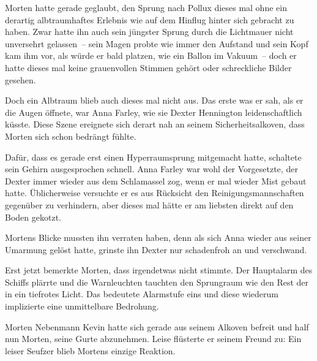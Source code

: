 Morten hatte gerade geglaubt, den Sprung nach Pollux dieses mal ohne ein derartig albtraumhaftes Erlebnis wie auf dem Hinflug hinter sich gebracht zu haben. Zwar hatte ihn auch sein jüngster Sprung durch die Lichtmauer nicht unversehrt gelassen~-- sein Magen probte wie immer den Aufstand und sein Kopf kam ihm vor, als würde er bald platzen, wie ein Ballon im Vakuum~-- doch er hatte dieses mal keine grauenvollen Stimmen gehört oder schreckliche Bilder gesehen.

\par

Doch ein Albtraum blieb auch dieses mal nicht aus. Das erste was er sah, als er die Augen öffnete, war Anna Farley, wie sie Dexter Hennington leidenschaftlich küsste. Diese Szene ereignete sich derart nah an seinem Sicherheitsalkoven, dass Morten sich schon bedrängt fühlte.

\par

Dafür, dass es gerade erst einen Hyperraumsprung mitgemacht hatte, schaltete sein Gehirn ausgesprochen schnell. Anna Farley war wohl der Vorgesetzte, der Dexter immer wieder aus dem Schlamassel zog, wenn er mal wieder Mist gebaut hatte. Üblicherweise versuchte er es aus Rücksicht den Reinigungsmannschaften gegenüber zu verhindern, aber dieses mal hätte er am liebsten direkt auf den Boden gekotzt.

\par

Mortens Blicke mussten ihn verraten haben, denn als sich Anna wieder aus seiner Umarmung gelöst hatte, grinste ihn Dexter nur schadenfroh an und verschwand.

\par

Erst jetzt bemerkte Morten, dass irgendetwas nicht stimmte. Der Hauptalarm des Schiffs plärrte und die Warnleuchten tauchten den Sprungraum wie den Rest der  in ein tiefrotes Licht. Das bedeutete Alarmstufe eins und diese wiederum implizierte eine unmittelbare Bedrohung.

\par

Morten Nebenmann Kevin hatte sich gerade aus seinem Alkoven befreit und half nun Morten, seine Gurte abzunehmen. Leise flüsterte er seinem Freund zu:  Ein leiser Seufzer blieb Mortens einzige Reaktion.

\par

